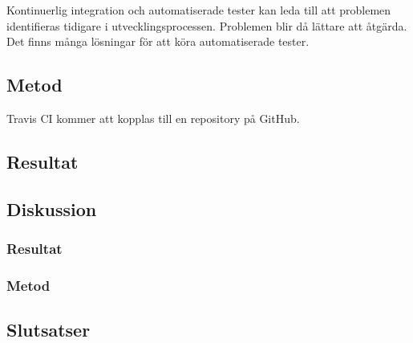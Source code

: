 Kontinuerlig integration och automatiserade tester kan leda till att problemen identifieras tidigare i utvecklingsprocessen. Problemen blir då lättare att åtgärda.\\

Det finns många lösningar för att köra automatiserade tester.\\

\subsection{Metod}
Travis CI kommer att kopplas till en repository på GitHub.

\subsection{Resultat}
\subsection{Diskussion}
\subsubsection{Resultat}
\subsubsection{Metod}
\subsection{Slutsatser}
